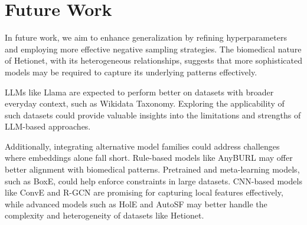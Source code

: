 \section*{Future Work}


In future work, we aim to enhance generalization by refining hyperparameters and employing more effective negative sampling strategies.
The biomedical nature of Hetionet, with its heterogeneous relationships, suggests that more sophisticated models may be required to capture its underlying patterns effectively.

LLMs like Llama are expected to perform better on datasets with broader everyday context, such as Wikidata Taxonomy.
Exploring the applicability of such datasets could provide valuable insights into the limitations and strengths of LLM-based approaches.

Additionally, integrating alternative model families could address challenges where embeddings alone fall short.
Rule-based models like AnyBURL may offer better alignment with biomedical patterns.
Pretrained and meta-learning models, such as BoxE, could help enforce constraints in large datasets.
CNN-based models like ConvE and R-GCN are promising for capturing local features effectively, while advanced models such as HolE and AutoSF may better handle the complexity and heterogeneity of datasets like Hetionet.

